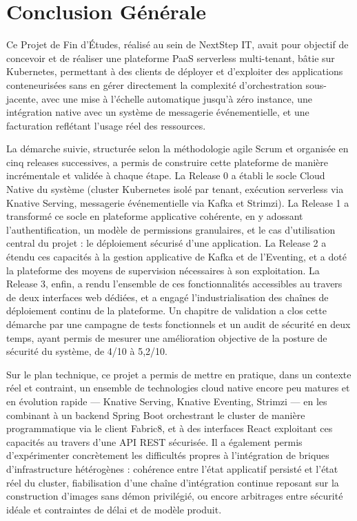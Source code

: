 \chapter*{Conclusion Générale }

Ce Projet de Fin d'Études, réalisé au sein de NextStep IT, avait pour objectif de concevoir et de réaliser une plateforme PaaS serverless multi-tenant, bâtie sur Kubernetes, permettant à des clients de déployer et d'exploiter des applications conteneurisées sans en gérer directement la complexité d'orchestration sous-jacente, avec une mise à l'échelle automatique jusqu'à zéro instance, une intégration native avec un système de messagerie événementielle, et une facturation reflétant l'usage réel des ressources.

La démarche suivie, structurée selon la méthodologie agile Scrum et organisée en cinq releases successives, a permis de construire cette plateforme de manière incrémentale et validée à chaque étape. La Release 0 a établi le socle Cloud Native du système (cluster Kubernetes isolé par tenant, exécution serverless via Knative Serving, messagerie événementielle via Kafka et Strimzi). La Release 1 a transformé ce socle en plateforme applicative cohérente, en y adossant l'authentification, un modèle de permissions granulaires, et le cas d'utilisation central du projet : le déploiement sécurisé d'une application. La Release 2 a étendu ces capacités à la gestion applicative de Kafka et de l'Eventing, et a doté la plateforme des moyens de supervision nécessaires à son exploitation. La Release 3, enfin, a rendu l'ensemble de ces fonctionnalités accessibles au travers de deux interfaces web dédiées, et a engagé l'industrialisation des chaînes de déploiement continu de la plateforme. Un chapitre de validation a clos cette démarche par une campagne de tests fonctionnels et un audit de sécurité en deux temps, ayant permis de mesurer une amélioration objective de la posture de sécurité du système, de 4/10 à 5{,}2/10.

Sur le plan technique, ce projet a permis de mettre en pratique, dans un contexte réel et contraint, un ensemble de technologies cloud native encore peu matures et en évolution rapide — Knative Serving, Knative Eventing, Strimzi — en les combinant à un backend Spring Boot orchestrant le cluster de manière programmatique via le client Fabric8, et à des interfaces React exploitant ces capacités au travers d'une API REST sécurisée. Il a également permis d'expérimenter concrètement les difficultés propres à l'intégration de briques d'infrastructure hétérogènes : cohérence entre l'état applicatif persisté et l'état réel du cluster, fiabilisation d'une chaîne d'intégration continue reposant sur la construction d'images sans démon privilégié, ou encore arbitrages entre sécurité idéale et contraintes de délai et de modèle produit.

